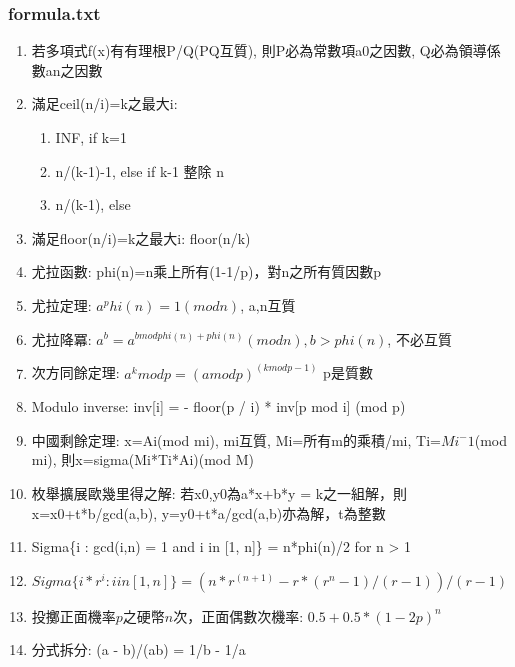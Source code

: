 %

\subsubsection {formula.txt}
\begin{enumerate}\itemsep = -5pt
\item 若多項式f(x)有有理根P/Q(PQ互質), 則P必為常數項a0之因數, Q必為領導係數an之因數
\item 滿足ceil(n/i)=k之最大i:
	\begin{enumerate}\itemsep = -3pt
	\item INF, if k=1
	\item n/(k-1)-1, else if k-1 整除 n
	\item n/(k-1), else
	\end {enumerate}
\item 滿足floor(n/i)=k之最大i: floor(n/k)
\item 尤拉函數: phi(n)=n乘上所有(1-1/p)，對n之所有質因數p
\item 尤拉定理: $a^phi(n) = 1 (mod n)$, a,n互質
\item 尤拉降冪: $a^b = a^{b mod phi(n)+phi(n)} (mod n), b>phi(n)$, 不必互質
\item 次方同餘定理: $a^k mod p = (a mod p)^{(k mod p-1)}$ p是質數
\item Modulo inverse: inv[i] = - floor(p / i) * inv[p mod i] (mod p)
\item 中國剩餘定理: x=Ai(mod mi), mi互質, Mi=所有m的乘積/mi, Ti=$Mi^-1$(mod mi), 則x=sigma(Mi*Ti*Ai)(mod M)
\item 枚舉擴展歐幾里得之解:
	若x0,y0為a*x+b*y = k之一組解，則
	x=x0+t*b/gcd(a,b), y=y0+t*a/gcd(a,b)亦為解，t為整數
\item Sigma\{i : gcd(i,n) = 1 and i in [1, n]\} = n*phi(n)/2 for n > 1
\item $Sigma\{i * r^i : i in [1, n]\} = (n*r^(n+1) - r*(r^n-1)/(r-1)) / (r-1)$
\item 投擲正面機率$p$之硬幣$n$次，正面偶數次機率: $0.5 + 0.5*(1-2p)^n$
\item 分式拆分: (a - b)/(ab) = 1/b - 1/a


\end{enumerate}
